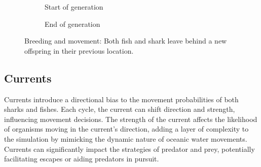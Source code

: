 \documentclass[conference,compsoc]{IEEEtran}
\begin{document}
\begin{figure}[h]
    \centering
    
    \begin{subfigure}[b]{0.45\textwidth}
        \centering
        \caption{Start of generation}
    \end{subfigure}
    \hfill %
    \begin{subfigure}[b]{0.45\textwidth}
        \centering
        \caption{End of generation}
    \end{subfigure}
    
    \caption{Breeding and movement: Both fish and shark leave behind a new offspring in their previous location.}
\end{figure}


\subsection{Currents}

Currents introduce a directional bias to the movement probabilities of both sharks and fishes. Each cycle, the current can shift direction and strength, influencing movement decisions. The strength of the current affects the likelihood of organisms moving in the current's direction, adding a layer of complexity to the simulation by mimicking the dynamic nature of oceanic water movements. Currents can significantly impact the strategies of predator and prey, potentially facilitating escapes or aiding predators in pursuit.
\end{document}
